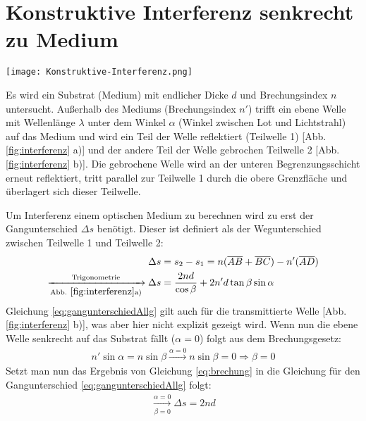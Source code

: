 
\newpage
\section{Konstruktive Interferenz senkrecht zu Medium}
\label{sec:interferenz}
\begin{center}
	\captionsetup{type=figure}
	\texttt{[image: Konstruktive-Interferenz.png]}
	\label{fig:interferenz}
\end{center}
Es wird ein Substrat (Medium) mit endlicher Dicke $d$ und Brechungsindex $n$ untersucht. Außerhalb des Mediums (Brechungsindex $n'$) trifft ein ebene Welle mit Wellenlänge $\lambda$ unter dem Winkel $\alpha$ (Winkel zwischen Lot und Lichtstrahl) auf das Medium und wird ein Teil der Welle reflektiert (Teilwelle 1) [Abb. \ref{fig:interferenz} a)] und der andere Teil der Welle gebrochen Teilwelle 2 [Abb. \ref{fig:interferenz} b)]. Die gebrochene Welle wird an der unteren Begrenzungsschicht erneut reflektiert, tritt parallel zur Teilwelle 1 durch die obere Grenzfläche und überlagert sich dieser Teilwelle.\bigskip

Um Interferenz einem optischen Medium zu berechnen wird zu erst der Gangunterschied $\Delta s$ benötigt.
Dieser ist definiert als der Wegunterschied zwischen Teilwelle 1 und Teilwelle 2: 
\begin{gather}
	\begin{aligned}
		\Delta s &= s_2 - s_1 = n(\overline{AB} + \overline{BC}) - n'(\overline{AD}) \\ 
		\xrightarrow[\mathrm{Abb.}~ \ref{fig:interferenz} \mathrm{a)}]{\mathrm{Trigonometrie}} \Delta s &= \frac{2nd}{\cos\beta} + 2n'd\tan\beta\sin\alpha
	\end{aligned}
	\label{eq:gangunterschiedAllg} 
\end{gather}
Gleichung \ref{eq:gangunterschiedAllg} gilt auch für die transmittierte Welle [Abb. \ref{fig:interferenz} b)], was aber hier nicht explizit gezeigt wird. Wenn nun die ebene Welle senkrecht auf das Substrat fällt ($\alpha = 0$) folgt aus dem Brechungsgesetz:
\begin{gather}
	n'\sin\alpha=n\sin\beta \xrightarrow{\alpha=0} n\sin\beta = 0 \Rightarrow \boxed{\beta = 0}
	\label{eq:brechung}
\end{gather}
Setzt man nun das Ergebnis von Gleichung \ref{eq:brechung} in die Gleichung für den Gangunterschied \ref{eq:gangunterschiedAllg} folgt:
\begin{gather}
	\xrightarrow[\beta = 0]{\alpha = 0} \boxed{\Delta s = 2nd}
	\label{eq:gangunterschied}
\end{gather}\bigskip

